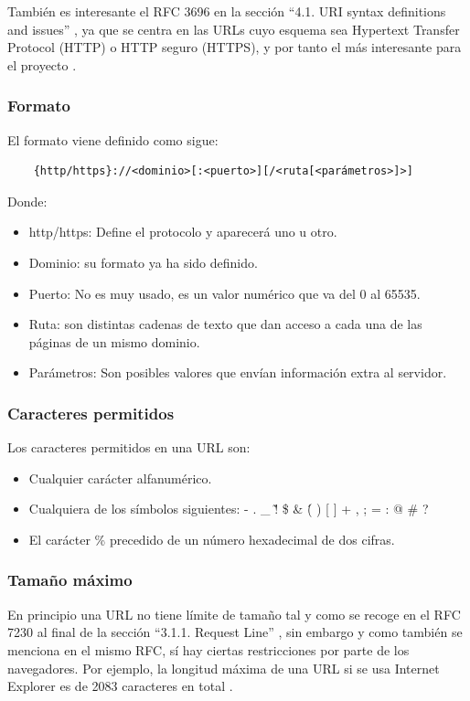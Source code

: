 También es interesante el RFC 3696 en la sección “4.1.  URI syntax definitions and issues” \cite{rfc3696_section4_1}, ya que se centra en las URLs cuyo esquema sea Hypertext Transfer Protocol (HTTP) o HTTP seguro (HTTPS), y por tanto el más interesante para el proyecto .

\subsubsection{Formato}
El formato viene definido como sigue: 
\begin{verbatim}
    {http/https}://<dominio>[:<puerto>][/<ruta[<parámetros>]>]
\end{verbatim}

Donde:
\begin{itemize}
    \item http/https: Define el protocolo y aparecerá uno u otro. 
    \item Dominio: su formato ya ha sido definido.
    \item Puerto: No es muy usado, es un valor numérico que va del 0 al 65535.
    \item Ruta: son distintas cadenas de texto que dan acceso a cada una de las páginas de un mismo dominio.
    \item Parámetros: Son posibles valores que envían información extra al servidor. 
\end{itemize}

\subsubsection{Caracteres permitidos}
Los caracteres permitidos en una URL son:
\begin{itemize}
    \item Cualquier carácter alfanumérico.
    \item Cualquiera de los símbolos siguientes: - . \_ \~ ! \$ \& \' ( ) [ ] \* + , ; = : @ \# ? \/
    \item El carácter \% precedido de un número hexadecimal de dos cifras. 
\end{itemize}

\subsubsection{Tamaño máximo}
En principio una URL no tiene límite de tamaño tal y como se recoge en el RFC 7230 al final de la sección “3.1.1.  Request Line” \cite{rfc7230_section_3_1_1}, sin embargo y como también se menciona en el mismo RFC, sí hay ciertas restricciones por parte de los navegadores. Por ejemplo, la longitud máxima de una URL si se usa Internet Explorer es de 2083 caracteres en total \cite{maximum_url_length}.


